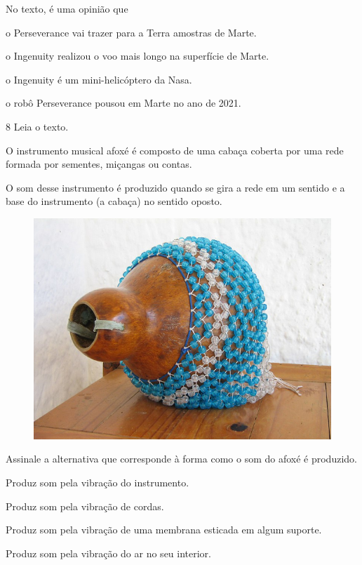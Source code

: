 
No texto, é uma opinião que

\begin{escolha}
\item o Perseverance vai trazer para a Terra amostras de Marte.

\item o Ingenuity realizou o voo mais longo na superfície de Marte.

\item o Ingenuity é um mini-helicóptero da Nasa.

\item o robô Perseverance pousou em Marte no ano de 2021.
\end{escolha}



\num{8}  Leia o texto.

O instrumento musical afoxé é composto de uma cabaça coberta por uma
rede formada por sementes, miçangas ou contas.

O som desse instrumento é
produzido quando se gira a rede em um sentido e a base do instrumento (a
cabaça) no sentido oposto.

\begin{figure}[htpb!]
\centering
\includegraphics[width=.55\textwidth]{./imgs/art33.png}
\end{figure}

Assinale a alternativa que corresponde à forma como o som do afoxé é
produzido.

\begin{escolha}
\item
  Produz som pela vibração do instrumento.
\item
  Produz som pela vibração de cordas.
\item
  Produz som pela vibração de uma membrana esticada em algum suporte.
\item
  Produz som pela vibração do ar no seu interior.
\end{escolha}



